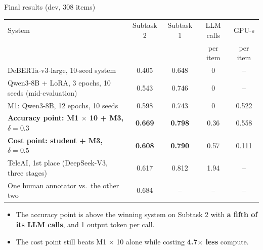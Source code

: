 \documentclass[aspectratio=169,10pt]{beamer}
\newcommand{\hl}[1]{\textcolor{accent}{\textbf{#1}}}
\begin{document}
\begin{frame}{Final results (dev, 308 items)}
  \centering
  \footnotesize
  \begin{tabular}{@{}lcccc@{}}
    \toprule
    System & Subtask 2 & Subtask 1 & LLM calls & GPU-s \\
           &           &           & per item  & per item \\
    \midrule
    DeBERTa-v3-large, 10-seed system & 0.405 & 0.648 & 0 & -- \\
    Qwen3-8B + LoRA, 3 epochs, 10 seeds (mid-evaluation) & 0.543 & 0.746 & 0 & -- \\
    M1: Qwen3-8B, 12 epochs, 10 seeds & 0.598 & 0.743 & 0 & 0.522 \\
    \textbf{Accuracy point: M1 $\times$ 10 + M3, $\delta=0.3$} & \textbf{0.669} & \textbf{0.798} & 0.36 & 0.558 \\
    \textbf{Cost point: student + M3, $\delta=0.5$} & \textbf{0.608} & \textbf{0.790} & 0.57 & 0.111 \\
    \midrule
    TeleAI, 1st place (DeepSeek-V3, three stages) & 0.617 & 0.812 & 1.94 & -- \\
    One human annotator vs.\ the other two & 0.684 & -- & -- & -- \\
    \bottomrule
  \end{tabular}
  \vspace{8pt}
  \begin{itemize}\small
    \item The accuracy point is above the winning system on Subtask 2 with \hl{a fifth of its LLM calls}, and 1 output token per call.
    \item The cost point still beats M1 $\times$ 10 alone while costing \hl{4.7$\times$ less} compute.
  \end{itemize}
\end{frame}
\end{document}
